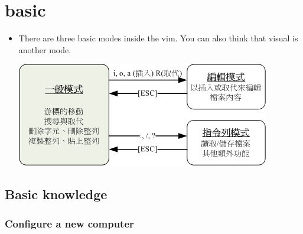 \documentclass[a4paper,11pt,twoside]{book}
\begin{document}
\section{basic}
\begin{itemize}
    \item There are three basic modes inside the vim. You can also think that visual is another mode. 

\includegraphics[scale=0.8]{pics/vi-mode} \\
\end{itemize}

\subsection{Basic knowledge}
\subsubsection{Configure a new computer}
\end{document}
